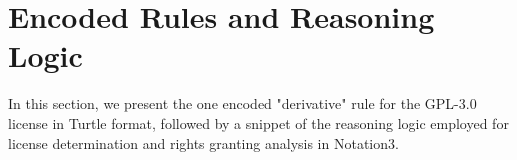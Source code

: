 \section{Encoded Rules and Reasoning Logic}
\label{apdx:rules}
In this section, we present the one encoded "derivative" rule for the GPL-3.0 license in Turtle format, followed by a snippet of the reasoning logic employed for license determination and rights granting analysis in Notation3.

